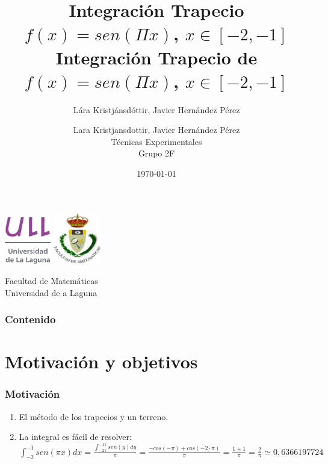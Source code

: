 \documentclass{beamer}
\title{Integración Trapecio \\ $f(x)=sen(\Pi x)$, $x \in [-2,-1]$}
\author{Lára Kristjánsdóttir, Javier Hernández Pérez}
\author{Lara Kristjansdottir, Javier Hernández Pérez\\ Técnicas Experimentales \\ Grupo 2F}
\date{\today}
\begin{document}
\begin{frame}
  \includegraphics[width=0.15\textwidth]{img/ullesc.eps}
  \hspace*{7.5cm}
  \includegraphics[width=0.16\textwidth]{img/fmatesc.eps}
  \titlepage
  \begin{scriptsize}
    \begin{center}
    \title{Integración Trapecio de $f(x)=sen(\Pi x)$, $x \in [-2,-1]$}
      Facultad de Matemáticas \\Universidad de a Laguna
    \end{center}
  \end{scriptsize}
\end{frame}
\begin{frame}
  \frametitle{Contenido}
  \tableofcontents
\end{frame} 
\section{Motivación y objetivos}
\begin{frame}
\frametitle{Motivación}
\begin{enumerate}
\item El método de los trapecios y un terreno.\\
\pause
\item La integral es fácil de resolver:\\
$\int _{-2}^{-1} sen(\pi x) dx=\frac{\int _{-2 \pi}^{-1\pi}sen(y)dy}{\pi}=\frac{-cos(-\pi)+cos(-2 \cdot \pi)}{\pi}=\frac{1+1}{\pi}=\frac{2}{\pi}\simeq 0,6366197724$
\end{enumerate}
\end{frame}
\end{document}
